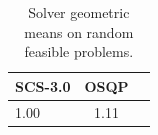 \begin{table}
\centering
\caption{Solver geometric means on random feasible problems.}
\label{t-random feasible-geom_mean}
\begin{tabular}{lcc}
\toprule
 SCS-3.0 &  OSQP \\
\midrule
    1.00 &  1.11 \\
\bottomrule
\end{tabular}
\end{table}
